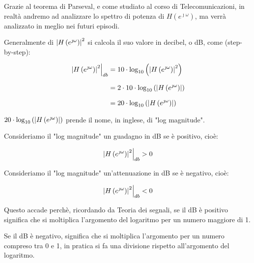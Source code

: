 \begin{tcolorbox}
    Grazie al teorema di Parseval, e come studiato al corso di Telecomunicazioni, in realtà andremo ad analizzare lo spettro di potenza di $H \left( e^{\jmath \omega}\right)$, 
    ma verrà analizzato in meglio nei futuri episodi.
\end{tcolorbox}

Generalmente di $\abs{H \left( e^{\jmath \omega}\right)}^{2}$ si calcola il suo valore in decibel, o dB, come (step-by-step): 

{
    \Large 
    \begin{equation}
        \setlength{\jot}{10pt} %
        \begin{split}
            \left. 
                \abs{H \left( e^{\jmath \omega}\right)}^{2}
            \right|_{db}
            &=
            10 \cdot \log_{10} \left( \abs{H \left( e^{\jmath \omega}\right)}^{2}\right)
            \\
            &= 
            2 \cdot 10 \cdot \log_{10} \left( \abs{H \left( e^{\jmath \omega}\right)}\right)
            \\
            &= 
            20 \cdot \log_{10} \left( \abs{H \left( e^{\jmath \omega}\right)}\right)
        \end{split}
    \end{equation}
}

$20 \cdot \log_{10} \left( \abs{H \left( e^{\jmath \omega}\right)}\right)$ prende il nome, in inglese, di "log magnitude". \newline 

Consideriamo il "log magnitude" un guadagno in dB se è positivo, cioè: 

{
    \Large 
    \begin{equation}
            \left. 
                \abs{H \left( e^{\jmath \omega}\right)}^{2}
            \right|_{db} 
            > 0
    \end{equation}
}

Consideriamo il "log magnitude" un'attenuazione in dB se è negativo, cioè: 

{
    \Large 
    \begin{equation}
            \left. 
                \abs{H \left( e^{\jmath \omega}\right)}^{2}
            \right|_{db}
            < 0
    \end{equation}
}

\begin{tcolorbox}
    Questo accade perchè, ricordando da Teoria dei segnali, se il dB è positivo significa che si moltiplica l'argomento del logaritmo per un numero maggiore di 1. \newline 

    Se il dB è negativo, significa che si moltiplica l'argomento per un numero compreso tra 0 e 1, in pratica si fa una divisione rispetto all'argomento del logaritmo. 
\end{tcolorbox}

